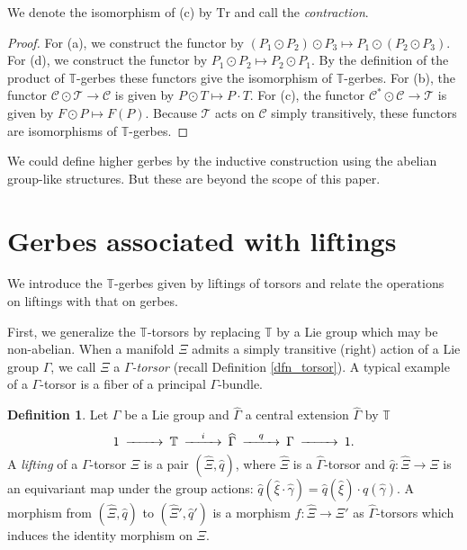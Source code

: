 \documentclass[a4paper,a4paper]{article}
\theoremstyle{definition}
\newtheorem{dfn}[thm]{Definition}
\theoremstyle{remark}
\newcommand{\T}{\mathbb{T}}
\newcommand{\sC}{\mathcal{C}}
\newcommand{\sT}{\mathcal{T}}
\newcommand{\Tr}{\mathrm{Tr}}
\newcommand{\hq}{\widehat{q}}
\def\h#1{ \widehat{#1} }
\begin{document}
We denote the isomorphism of (c) by $\Tr$ and call the \textit{contraction}.

\begin{proof}
For (a), we construct the functor by $(P_1 \odot P_2) \odot P_3 \mapsto P_1 \odot (P_2 \odot P_3)$. For (d), we construct the functor by $P_1 \odot P_2 \mapsto P_2 \odot P_1$. By the definition of the product of $\T$-gerbes these functors give the isomorphism of $\T$-gerbes. For (b), the functor $\sC \odot \sT \to \sC$ is given by $P \odot T \mapsto P \cdot T$. For (c), the functor $\sC^* \odot \sC \to \sT$ is given by $F \odot P \mapsto F(P)$. Because $\sT$ acts on $\sC$ simply transitively, these functors are isomorphisms of $\T$-gerbes.
\end{proof}

We could define higher gerbes \cite{F2} by the inductive construction using the abelian group-like structures. But these are beyond the scope of this paper.


\section{Gerbes associated with liftings}
\label{la_lifting_gerbe}

We introduce the $\T$-gerbes given by liftings of torsors and relate the operations on liftings with that on gerbes. 

\smallskip

First, we generalize the $\T$-torsors by replacing $\T$ by a Lie group which may be non-abelian. When a manifold $\Xi$ admits a simply transitive (right) action of a Lie group $\Gamma$, we call $\Xi$ a \textit{$\Gamma$-torsor} (recall Definition \ref{dfn_torsor}). A typical example of a $\Gamma$-torsor is a fiber of a principal $\Gamma$-bundle.

\begin{dfn}
Let $\Gamma$ be a Lie group and $\h{\Gamma}$ a central extension $\h{\Gamma}$ by $\T$ 
$$
\begin{CD}
1 @>>> \T @>i>> \h{\Gamma} @>q>> \Gamma @>>> 1.
\end{CD}
$$
A \textit{lifting} of a $\Gamma$-torsor $\Xi$ is a pair $(\h{\Xi}, \hq)$, where $\h{\Xi}$ is a $\h{\Gamma}$-torsor and $\hq : \h{\Xi} \to \Xi$ is an equivariant map under the group actions: $\hq(\h{\xi} \cdot \h{\gamma}) = \hq(\h{\xi}) \cdot q(\h{\gamma})$. A morphism from $(\h{\Xi}, \hq)$ to $(\h{\Xi}', \hq')$ is a morphism $f : \h{\Xi} \to \h{\Xi}'$ as $\h{\Gamma}$-torsors which induces the identity morphism on $\Xi$.
\end{dfn}
\end{document}
